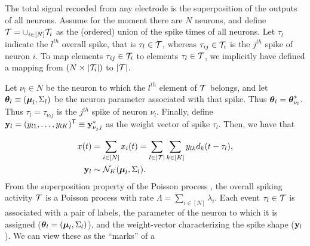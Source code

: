 
{The total signal recorded from any electrode  is the superposition of the outputs of all neurons. Assume for the moment there are $N$
neurons, and define $\mathcal{T} = \cup_{i \in [N]} \mathcal{T}_i$ as
the (ordered) union of the spike times of all neurons. 
Let $\tau_l$ indicate the $l^{th}$ overall spike, that is $\tau_l \in \mathcal{T}$, whereas $\tau_{ij} \in \mathcal{T}_i$ is the $j^{th}$ spike of neuron $i$.
To map elements  $\tau_{ij} \in \mathcal{T}_i$ to elements  $\tau_l \in \mathcal{T}$,   we implicitly have defined a mapping from $(N \times |\mathcal{T}_i|)$ to $|\mathcal{T}|$. %

Let $\nu_l \in N$ be the neuron to which the $l^{th}$ element of $\mathcal{T}$ belongs, 
and let $\boldsymbol{\theta}_l \equiv (\boldsymbol{\mu}_l, \Sigma_l)$ be the neuron parameter associated with
that spike. 
Thus $\boldsymbol{\theta}_l = \boldsymbol{\theta}^*_{\nu_l}$. 
Thus $\tau_l = \tau_{\nu_l j}$ is the $j^{th}$ spike of neuron $\nu_l$. Finally, define $\mathbf{y}_l=(y_{l1}, \ldots, y_{lK})^{\mathsf{T}} \equiv \mathbf{y}^*_{\nu_j j}$ as the weight vector of spike $\tau_l$. Then, we have that}
\begin{subequations}
\begin{align}
  x(t) &= \sum_{i \in [N]} x_{i}(t) =   \sum_{l \in |\mathcal{T}|} \sum_{k \in [K]} y_{lk} d_k(t - \tau_{l}),  \label{eq:spk_sup} \\
  \mathbf{y}_{l} & \sim \mathcal{N}_K(\boldsymbol{\mu}_{l}, \Sigma_{l}). \label{eq:spk_shape}
\end{align}
\end{subequations}
% 
From the superposition property of the Poisson process \citep{kingman93}, the overall spiking activity $\mathcal{T}$ is a 
Poisson process with rate $\Lambda = \sum_{i \in [N]} \lambda_i$. Each event $\tau_l \in \mathcal{T}$ is associated with a pair of labels, the parameter of the neuron to which it 
is assigned ($\boldsymbol{\theta}_l = (\boldsymbol{\mu}_l, \Sigma_l)$), and the weight-vector characterizing the spike shape ($\mathbf{y}_l$). We can view these as the ``marks'' of a 
